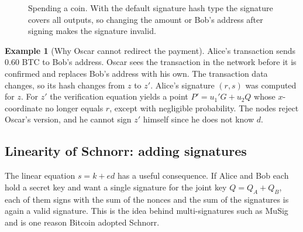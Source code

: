 \documentclass[11pt,a4paper]{article}
\theoremstyle{definition}
\newtheorem{example}[definition]{Example}
\newcommand{\Hash}{H}
\begin{document}
\begin{figure}[h]
\centering
{}
\caption{Spending a coin. With the default signature hash type the signature covers all outputs, so changing the amount or Bob's address after signing makes the signature invalid.}
\end{figure}

\begin{example}[Why Oscar cannot redirect the payment]
Alice's transaction sends $0.60$ BTC to Bob's address. Oscar sees the transaction in the network before it is confirmed and replaces Bob's address with his own. The transaction data changes, so its hash changes from $z$ to $z'$. Alice's signature $(r,s)$ was computed for $z$. For $z'$ the verification equation yields a point $P'=u_1'G+u_2Q$ whose $x$-coordinate no longer equals $r$, except with negligible probability. The nodes reject Oscar's version, and he cannot sign $z'$ himself since he does not know $d$.
\end{example}

\subsection{Linearity of Schnorr: adding signatures}

The linear equation $s=k+ed$ has a useful consequence. If Alice and Bob each hold a secret key and want a single signature for the joint key $Q=Q_A+Q_B$, each of them signs with the sum of the nonces and the sum of the signatures is again a valid signature. This is the idea behind multi-signatures such as MuSig and is one reason Bitcoin adopted Schnorr.
\end{document}
